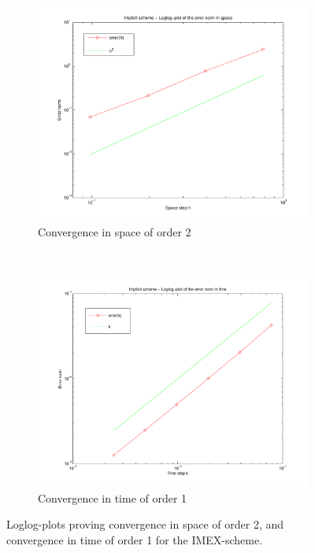 \begin{figure}[H]
        \centering
        \begin{subfigure}[b]{0.52\textwidth}
                \includegraphics[width=\textwidth]{../PDFs/IMEX/IMEX_space_conv.pdf}
                \caption{Convergence in space of order 2}
                \label{fig:convSpace}
        \end{subfigure}%
        ~ %
        \begin{subfigure}[b]{0.52\textwidth}
                \includegraphics[width=\textwidth]{../PDFs/IMEX/IMEX_time_conv.pdf}
                \caption{Convergence in time of order 1}
                \label{fig:convTime}
        \end{subfigure}
        \caption{Loglog-plots proving convergence in space of order 2, and convergence in time of order 1 for the IMEX-scheme.}\label{fig:convergence}
\end{figure}

